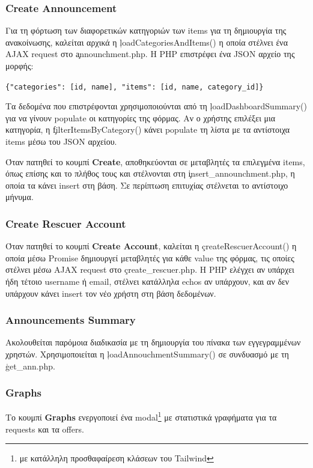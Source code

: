         \subsubsection{Create Announcement}
            Για τη φόρτωση των διαφορετικών κατηγοριών των items για τη δημιουργία της ανακοίνωσης, καλείται αρχικά η \c{loadCategoriesAndItems()}
            η οποία στέλνει ένα AJAX request στο \c{announchment.php}.
            Η PHP επιστρέφει ένα JSON αρχείο της μορφής:

            \begin{graycomment}
                \verb|{"categories": [id, name], "items": [id, name, category_id]}|
            \end{graycomment}

            Τα δεδομένα που επιστρέφονται χρησιμοποιούνται από τη \c{loadDashboardSummary()} για να γίνουν populate οι κατηγορίες της φόρμας.
            Αν ο χρήστης επιλέξει μια κατηγορία, η \c{filterItemsByCategory()} κάνει populate τη λίστα με τα αντίστοιχα items μέσω του JSON αρχείου.

            Όταν πατηθεί το κουμπί \textbf{Create}, αποθηκεύονται σε μεταβλητές τα επιλεγμένα items, όπως επίσης και το πλήθος τους
            και στέλνονται στη \c{insert\_announchment.php}, η οποία τα κάνει insert στη βάση.
            Σε περίπτωση επιτυχίας στέλνεται το αντίστοιχο μήνυμα.

        \subsubsection{Create Rescuer Account}
            Όταν πατηθεί το κουμπί \textbf{Create Account}, καλείται η \c{createRescuerAccount()} η οποία μέσω Promise δημιουργεί μεταβλητές για κάθε value της φόρμας,
                τις οποίες στέλνει μέσω AJAX request στο \c{create\_rescuer.php}.
            Η PHP ελέγχει αν υπάρχει ήδη τέτοιο username ή email, στέλνει κατάλληλα echos αν υπάρχουν, και αν δεν υπάρχουν κάνει insert τον νέο χρήστη στη βάση δεδομένων.

        \subsubsection{Announcements Summary}
            Ακολουθείται παρόμοια διαδικασία με τη δημιουργία του πίνακα των εγγεγραμμένων χρηστών.
            Χρησιμοποιείται η \c{loadAnnouchmentSummary()} σε συνδυασμό με τη \c{get\_ann.php}.

        \subsubsection{Graphs}
            Το κουμπί \textbf{Graphs} ενεργοποιεί ένα modal\footnote{με κατάλληλη προσθαφαίρεση κλάσεων του Tailwind} με στατιστικά γραφήματα για τα requests και τα offers.

